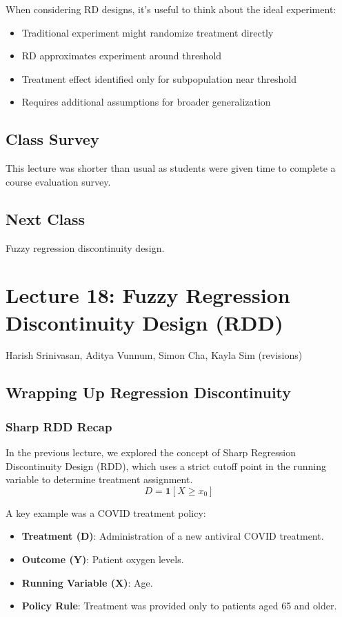 When considering RD designs, it's useful to think about the ideal experiment:
\begin{itemize}
    \item Traditional experiment might randomize treatment directly
    \item RD approximates experiment around threshold
    \item Treatment effect identified only for subpopulation near threshold
    \item Requires additional assumptions for broader generalization
\end{itemize}

\subsection*{Class Survey}
This lecture was shorter than usual as students were given time to complete a course evaluation survey.

\subsection*{Next Class}
Fuzzy regression  discontinuity design.

\section{Lecture 18: Fuzzy Regression Discontinuity Design (RDD)}{Harish Srinivasan, Aditya Vunnum, Simon Cha, Kayla Sim (revisions)}

\subsection{Wrapping Up Regression Discontinuity}

\subsubsection{Sharp RDD Recap}

In the previous lecture, we explored the concept of Sharp Regression Discontinuity Design (RDD), which uses a strict cutoff point in the running variable to determine treatment assignment. 
\[D = \mathbf{1}[X \geq x_0]\]

A key example was a COVID treatment policy:
\begin{itemize}
    \item \textbf{Treatment (D)}: Administration of a new antiviral COVID treatment.
    \item \textbf{Outcome (Y)}: Patient oxygen levels.
    \item \textbf{Running Variable (X)}: Age.
    \item \textbf{Policy Rule}: Treatment was provided only to patients aged 65 and older.
\end{itemize}

